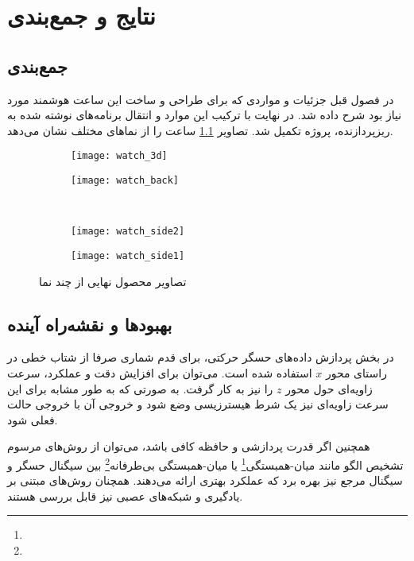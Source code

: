 \chapter{نتایج و جمع‌بندی} \label{sec:result}

\section{جمع‌بندی}
در فصول قبل جزئیات و مواردی که برای طراحی و ساخت این ساعت هوشمند مورد نیاز بود شرح داده شد. در نهایت با ترکیب این موارد و انتقال برنامه‌های نوشته شده به ریزپردازنده، پروژه تکمیل شد. تصاویر \ref{fig:reals} ساعت را از نماهای مختلف نشان می‌دهد.

 \begin{figure}[h]
	\centering
	\begin{subfigure}{0.48\textwidth}
		\centering
		\texttt{[image: watch\_3d]}
		\caption{}
	\end{subfigure}
	\begin{subfigure}{0.48\textwidth}
		\centering
		\texttt{[image: watch\_back]}
		\caption{}
	\end{subfigure} \\
	\begin{subfigure}{0.48\textwidth}
		\centering
		\texttt{[image: watch\_side2]}
		\caption{}
	\end{subfigure}
	\begin{subfigure}{0.48\textwidth}
		\centering
		\texttt{[image: watch\_side1]}
		\caption{}
	\end{subfigure}
	\caption{تصاویر محصول نهایی از چند نما}
	\label{fig:reals}
\end{figure}

\section{بهبودها و نقشه‌راه آینده}
در بخش پردازش داده‌های حسگر حرکتی، برای قدم شماری صرفا از شتاب خطی در راستای محور $x$ استفاده شده است. می‌توان برای افزایش دقت و عملکرد، سرعت زاویه‌ای حول محور $z$ را نیز به کار گرفت. به صورتی که به طور مشابه برای این سرعت زاویه‌ای نیز یک شرط هیسترزیسی وضع شود و خروجی آن با خروجی حالت فعلی  شود.

همچنین اگر قدرت پردازشی و حافظه کافی باشد، می‌توان از روش‌های مرسوم تشخیص الگو مانند میان-همبستگی\footnote{}
یا میان-همبستگی بی‌طرفانه\footnote{}
بین سیگنال حسگر و سیگنال مرجع نیز بهره برد که عملکرد بهتری ارائه می‌دهند. همچنان روش‌های مبتنی بر یادگیری و شبکه‌های عصبی نیز قابل بررسی هستند.

